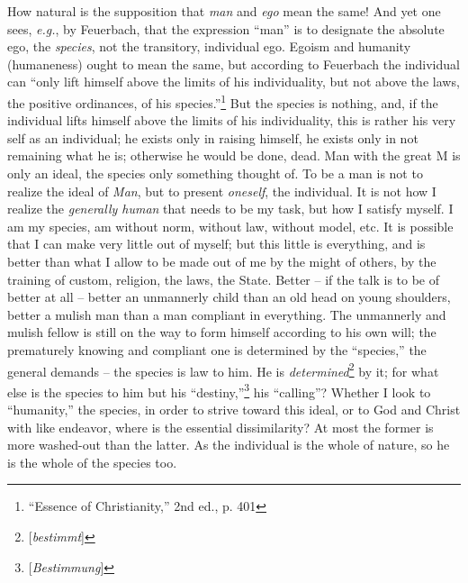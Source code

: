 \documentclass[12pt,a4paper]{book}
\begin{document}
How natural is the supposition that \textit{man} and \textit{ego} mean the 
same! And yet one sees, \textit{e.g.}, by Feuerbach, that the expression 
``man'' is to designate the absolute ego, the \textit{species}, not the 
transitory, individual ego. Egoism and humanity (humaneness) ought to mean the 
same, but according to Feuerbach the individual can ``only lift himself above 
the limits of his individuality, but not above the laws, the positive 
ordinances, of his species.''\footnote{``Essence of Christianity,'' 2nd 
ed., p. 401} But the species is nothing, and, if the individual lifts himself 
above the limits of his individuality, this is rather his very self as an 
individual; he exists only in raising himself, he exists only in not remaining 
what he is; otherwise he would be done, dead. Man with the great M is only an 
ideal, the species only something thought of. To be a man is not to realize 
the ideal of \textit{Man}, but to present \textit{oneself}, the individual. It 
is not how I realize the \textit{generally human} that needs to be my task, 
but how I satisfy myself. I am my species, am without norm, without law, 
without model, etc. It is possible that I can make very little out of myself; 
but this little is everything, and is better than what I allow to be made out 
of me by the might of others, by the training of custom, religion, the laws, 
the State. Better -- if the talk is to be of better at all -- better an 
unmannerly child than an old head on young shoulders, better a mulish man than 
a man compliant in everything. The unmannerly and mulish fellow is still on 
the way to form himself according to his own will; the prematurely knowing and 
compliant one is determined by the ``species,'' the general demands -- the 
species is law to him. He is \textit{determined}\footnote{[\textit{bestimmt}]} 
by it; for what else is the species to him but his 
``destiny,''\footnote{[\textit{Bestimmung}]} his ``calling''? Whether I 
look to ``humanity,'' the species, in order to strive toward this ideal, or 
to God and Christ with like endeavor, where is the essential dissimilarity? At 
most the former is more washed-out than the latter. As the individual is the 
whole of nature, so he is the whole of the species too.
\end{document}
